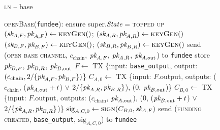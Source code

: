 \begin{figure}[H]
  \begin{processbox}{\textsc{ln} -- base}
    \begin{algorithmic}[1]
      \State \textsc{openBase}(\texttt{fundee}):
      \Indent
        \State ensure super.\textit{State} = \textsc{topped up}
        \State $(\textit{sk}_{A, F}, \textit{pk}_{A, F}) \gets \textsc{keyGen}()$;
        $(\textit{sk}_{A, R}, \textit{pk}_{A, R}) \gets \textsc{keyGen}()$
          \State $(\textit{sk}_{B, F}, \textit{pk}_{B, F}) \gets \textsc{keyGen}()$; $(\textit{sk}_{B, R},
          \textit{pk}_{B, R}) \gets \textsc{keyGen}()$
        \Else \: 
          \State send (\textsc{open base channel}, $c_{\mathrm{chain}}$, $\textit{pk}_{A,
          F}$, $\textit{pk}_{A, R}$, $\textit{pk}_{A, \mathrm{out}}$) to \texttt{fundee}
          \State {}
          \State {}
          \State {}
          \State {}
          \State {}
          \State store $\textit{pk}_{B, F}$, $\textit{pk}_{B, R}$, $\textit{pk}_{B, \mathrm{out}}$
        \EndIf
        \State $F \gets$ TX \{input: \texttt{base\_output}, output:
        $(c_{\mathrm{chain}}, 2/\{\textit{pk}_{A, F}, \textit{pk}_{B, F}\})$\}
        \label{code:ln:base:create-funding}
          \State $C_{A, 0} \gets$ TX \{input: $F$.output, outputs:
          ($c_{\mathrm{chain}}$, ($\textit{pk}_{A, \mathrm{out}} + t$) $\vee$ $2/\{\textit{pk}_{A,
          R}, \textit{pk}_{B, R}\}$), ($0$, $\textit{pk}_{B, \mathrm{out}}$)\}
          \State $C_{B, 0} \gets$ TX \{input: $F$.output, outputs:
          ($c_{\mathrm{chain}}$, $\textit{pk}_{A, \mathrm{out}}$), ($0$, ($\textit{pk}_{B,
          \mathrm{out}} + t$) $\vee$ $2/\{\textit{pk}_{A, R}, \textit{pk}_{B, R}\}$)\}
          \State $\mathrm{sig}_{A, C, 0} \gets \textsc{sign}(C_{B, 0}, \textit{sk}_{A,
          F})$
          \State send (\textsc{funding created}, \texttt{base\_output},
          $\mathrm{sig}_{A, C, 0}$) to \texttt{fundee}
          \State {}
          \State {}
          \State {}
\end{algorithmic}
\end{processbox}
\end{figure}
